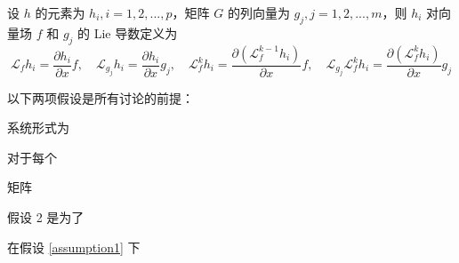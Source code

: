 设 $h$ 的元素为 $h_i, i = 1, 2, ..., p$，矩阵 $G$ 的列向量为 $g_j, j = 1, 2, ..., m$，则 $h_i$ 对向量场 $f$ 和 $g_j$ 的 Lie 导数定义为
\begin{equation}
  \mathcal{L}_{f}h_{i}=\frac{\partial h_{i}}{\partial x}f,\quad\mathcal{L}_{g_{j}}h_{i}=\frac{\partial h_{i}}{\partial x}g_{j},\quad\mathcal{L}_{f}^{k}h_{i}=\frac{\partial(\mathcal{L}_{f}^{k-1}h_{i})}{\partial x}f,\quad\mathcal{L}_{g_{j}}\mathcal{L}_{f}^{k}h_{i}=\frac{\partial(\mathcal{L}_{f}^{k}h_{i})}{\partial x}g_{j}
\end{equation}

以下两项假设是所有讨论的前提：

\begin{assumption}\label{assumption1}
  系统形式为

\end{assumption}
 
\begin{assumption}\label{assumption2}
  对于每个 
\end{assumption}

\begin{remark}
  矩阵
\end{remark}

\begin{remark}
  假设 2 是为了
\end{remark}

在假设 \ref{assumption1} 下

